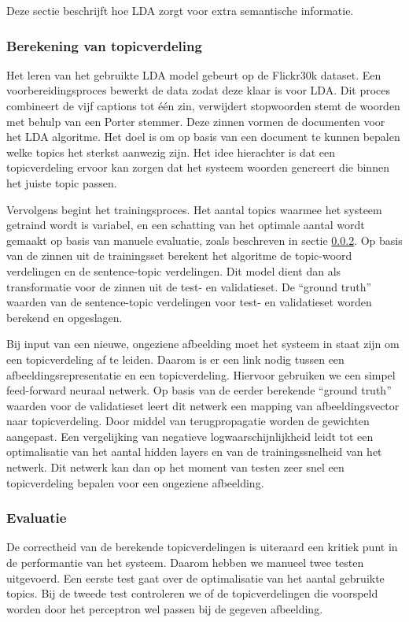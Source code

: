  Deze sectie beschrijft hoe LDA zorgt voor extra semantische informatie.

\subsubsection{Berekening van topicverdeling}
\label{subs:Berekening van topicverdeling}
Het leren van het gebruikte LDA model gebeurt op de Flickr30k dataset. Een voorbereidingsproces bewerkt de data zodat deze klaar is voor LDA. Dit proces combineert de vijf captions tot \'e\'en zin, verwijdert stopwoorden stemt de woorden met behulp van een Porter stemmer.  Deze zinnen vormen de documenten voor het LDA algoritme. Het doel is om op basis van een document te kunnen bepalen welke topics het sterkst aanwezig zijn. Het idee hierachter is dat een topicverdeling ervoor kan zorgen dat het systeem woorden genereert die binnen het juiste topic passen.

Vervolgens begint het trainingsproces. Het aantal topics waarmee het systeem getraind wordt is variabel, en een schatting van het optimale aantal wordt gemaakt op basis van manuele evaluatie, zoals beschreven in sectie \ref{subs:Evaluatie}. Op basis van de zinnen uit de trainingsset berekent het algoritme de topic-woord verdelingen en de sentence-topic verdelingen. Dit model dient dan als transformatie voor de zinnen uit de test- en validatieset. De ``ground truth'' waarden van de sentence-topic verdelingen voor test- en validatieset worden berekend en opgeslagen.

Bij input van een nieuwe, ongeziene afbeelding moet het systeem in staat zijn om een topicverdeling af te leiden. Daarom is er een link nodig tussen een afbeeldingsrepresentatie en een topicverdeling. Hiervoor gebruiken we een simpel feed-forward neuraal netwerk. Op basis van de eerder berekende ``ground truth'' waarden voor de validatieset leert dit netwerk een mapping van afbeeldingsvector naar topicverdeling. Door middel van terugpropagatie worden de gewichten aangepast. Een vergelijking van negatieve logwaarschijnlijkheid leidt tot een optimalisatie van het aantal hidden layers en van de trainingssnelheid van het netwerk. Dit netwerk kan dan op het moment van testen zeer snel een topicverdeling bepalen voor een ongeziene afbeelding.

\subsubsection{Evaluatie}
\label{subs:Evaluatie}
De correctheid van de berekende topicverdelingen is uiteraard een kritiek punt in de performantie van het systeem. Daarom hebben we manueel twee testen uitgevoerd. Een eerste test gaat over de optimalisatie van het aantal gebruikte topics. Bij de tweede test controleren we of de topicverdelingen die voorspeld worden door het perceptron wel passen bij de gegeven afbeelding.

